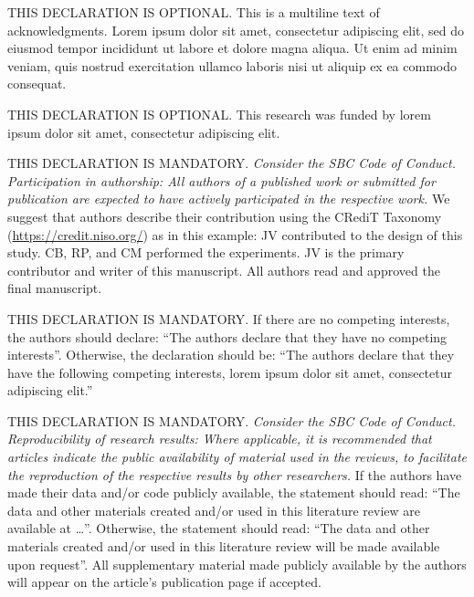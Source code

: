 \documentclass[english]{sbcreviews-2025}%
\begin{document}
\begin{declarations}

\begin{acknowledgements}
THIS DECLARATION IS OPTIONAL.
This is a multiline text of acknowledgments.
Lorem ipsum dolor sit amet, consectetur adipiscing elit,
sed do eiusmod tempor incididunt ut labore et dolore magna aliqua.
Ut enim ad minim veniam, quis nostrud exercitation ullamco laboris nisi ut aliquip ex ea commodo consequat.
\end{acknowledgements}

\begin{funding}
THIS DECLARATION IS OPTIONAL. This research was funded by lorem ipsum dolor sit amet, consectetur adipiscing elit.
\end{funding}

\begin{contributions}
THIS DECLARATION IS MANDATORY.
\textit{Consider the SBC Code of Conduct.
Participation in authorship: All authors of a published work
or submitted for publication are expected to have actively participated in the respective work.}
We suggest that authors describe their contribution using
the CRediT Taxonomy (\href{https://credit.niso.org/}{https://credit.niso.org/}) as in this example:
JV contributed to the design of this study. CB, RP, and CM performed the experiments.
JV is the primary contributor and writer of this manuscript.
All authors read and approved the final manuscript.
\end{contributions}

\begin{interests}
THIS DECLARATION IS MANDATORY. If there are no competing interests, the authors should declare: ``The authors declare that they have no competing interests''. Otherwise, the declaration should be: ``The authors declare that they have the following competing interests, lorem ipsum dolor sit amet, consectetur adipiscing elit.''
\end{interests}

\begin{materials}
THIS DECLARATION IS MANDATORY.
\textit{Consider the SBC Code of Conduct.
Reproducibility of research results:
Where applicable, it is recommended that articles indicate
the public availability of material used in the reviews,
to facilitate the reproduction of the respective results by other researchers.}
%
If the authors have made their data and/or code publicly available, the statement should read:
``The data and other materials created and/or used in this literature review
are available at \ldots''.
Otherwise, the statement should read:
``The data and other materials created and/or used in this literature review
will be made available upon request''.
%
All supplementary material made publicly available by the authors will appear
on the article's publication page if accepted.
\end{materials}


\end{declarations}
\end{document}
